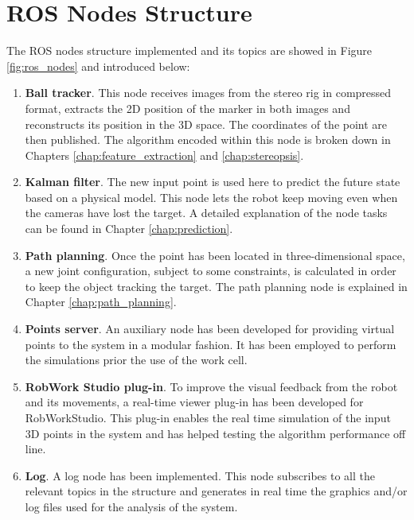 \chapter{ROS Nodes Structure} %
\label{chap:ros_nodes_structure}
The ROS nodes structure implemented and its topics are showed in Figure \ref{fig:ros_nodes} and introduced below:
\begin{enumerate}
	\item \textbf{Ball tracker}. This node receives images from the stereo rig in compressed format, extracts the 2D position of the marker in both images and reconstructs its position in the 3D space.
	The coordinates of the point are then published. The algorithm encoded within this node is broken down in Chapters \ref{chap:feature_extraction} and \ref{chap:stereopsis}.
	\item \textbf{Kalman filter}. The new input point is used here to predict the future state based on a physical model. This node lets the robot keep moving even when the cameras have lost the target.
	A detailed explanation of the node tasks can be found in Chapter \ref{chap:prediction}.
	\item \textbf{Path planning}. Once the point has been located in three-dimensional space, a new joint configuration, subject to some constraints, is calculated in order to keep the object tracking the target.
	The path planning node is explained in Chapter \ref{chap:path_planning}.
	\item \textbf{Points server}. An auxiliary node has been developed for providing virtual points to the system in a modular fashion.
	It has been employed to perform the simulations prior the use of the work cell.
	\item \textbf{RobWork Studio plug-in}. To improve the visual feedback from the robot and its movements, a real-time viewer plug-in has been developed for RobWorkStudio.
	This plug-in enables the real time simulation of the input 3D points in the system and has helped testing the algorithm performance off line.
	\item \textbf{Log}. A log node has been implemented.
	This node subscribes to all the relevant topics in the structure and generates in real time the graphics and/or log files used for the analysis of the system.
\end{enumerate}

